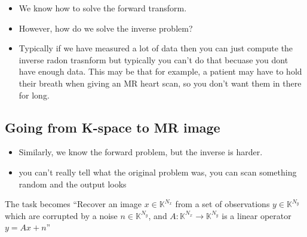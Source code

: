 \documentclass[11pt]{article}
\begin{document}
\begin{minipage}[l]{.5\linewidth}
    \begin{figure}[H]
        \centering
    \end{figure}    
\end{minipage}\hfill
\begin{minipage}[r]{.48\linewidth}
    \begin{itemize}
        \item We know how to solve the forward transform.
        \item However, how do we solve the inverse problem? 
        \item Typically if we have measured a lot of data then you can just compute the inverse radon trasnform but typically you can't do that becuase you dont have enough data. This may be that for example, a patient may have to hold their breath when giving an MR heart scan, so you don't want them in there for long.
    \end{itemize}
\end{minipage}

\begin{figure}[H]
    \centering
\end{figure}    

\subsection{Going from K-space to MR image}

\begin{minipage}[l]{.5\linewidth}
    \begin{figure}[H]
        \centering
    \end{figure}    
\end{minipage}\hfill
\begin{minipage}[r]{.48\linewidth}
    \begin{itemize}
        \item Similarly, we know the forward problem, but the inverse is harder.
        \item you can't really tell what the original problem was, you can scan something random and the output looks
    \end{itemize}

    The task becomes ``Recover an image $x\in \mathbb K^{N_x}$ from a set of observations $y \in \mathbb K^{N_y}$ which are corrupted by a noise $n\in \mathbb K^{N_y}$, and $A:\mathbb K^{N_x}\rightarrow \mathbb K^{N_y}$ is a linear operator $y=Ax+n$''
\end{minipage}
\end{document}
